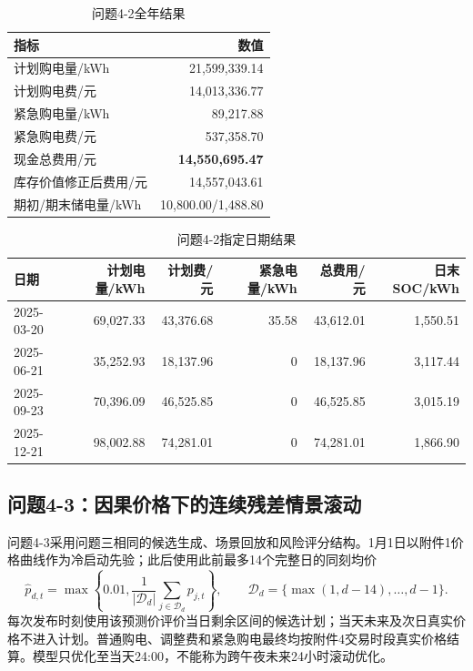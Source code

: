 \documentclass[UTF8,a4paper,12pt]{ctexart}
\begin{document}
\begin{table}[H]
\centering\small
\caption{问题4-2全年结果}\label{tab:q42-local}
\begin{tabular}{lr}
\toprule 指标 & 数值\\ \midrule
计划购电量/kWh & 21,599,339.14\\
计划购电费/元 & 14,013,336.77\\
紧急购电量/kWh & 89,217.88\\
紧急购电费/元 & 537,358.70\\
现金总费用/元 & \textbf{14,550,695.47}\\
库存价值修正后费用/元 & 14,557,043.61\\
期初/期末储电量/kWh & 10,800.00/1,488.80\\ \bottomrule
\end{tabular}
\end{table}

\begin{table}[H]
\centering\scriptsize
\caption{问题4-2指定日期结果}\label{tab:q42-dates-local}
\begin{tabular}{lrrrrr}
\toprule 日期 & 计划电量/kWh & 计划费/元 & 紧急电量/kWh & 总费用/元 & 日末SOC/kWh\\ \midrule
2025-03-20 & 69,027.33 & 43,376.68 & 35.58 & 43,612.01 & 1,550.51\\
2025-06-21 & 35,252.93 & 18,137.96 & 0 & 18,137.96 & 3,117.44\\
2025-09-23 & 70,396.09 & 46,525.85 & 0 & 46,525.85 & 3,015.19\\
2025-12-21 & 98,002.88 & 74,281.01 & 0 & 74,281.01 & 1,866.90\\ \bottomrule
\end{tabular}
\end{table}

\subsection{问题4-3：因果价格下的连续残差情景滚动}
问题4-3采用问题三相同的候选生成、场景回放和风险评分结构。1月1日以附件1价格曲线作为冷启动先验；此后使用此前最多14个完整日的同刻均价
\begin{equation}
 \widehat p_{d,t}=\max\left\{0.01,\frac1{|\mathcal D_d|}
 \sum_{j\in\mathcal D_d}p_{j,t}\right\},\qquad
 \mathcal D_d=\{\max(1,d-14),\ldots,d-1\}.
\end{equation}
每次发布时刻使用该预测价评价当日剩余区间的候选计划；当天未来及次日真实价格不进入计划。普通购电、调整费和紧急购电最终均按附件4交易时段真实价格结算。模型只优化至当天24:00，不能称为跨午夜未来24小时滚动优化。
\end{document}
